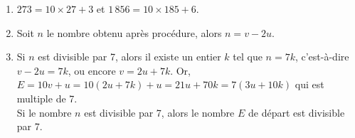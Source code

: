 \begin{enumerate}
         \begin{enumerate}
            \item {\blue $273 =10\times27+3$} et {\blue $1\,856 =10\times185+6$.}
            \item Soit $n$ le nombre obtenu après procédure, alors {\blue $n=v-2u$.}
            \item Si $n$ est divisible par 7, alors il existe un entier $k$ tel que $n=7k$, c'est-à-dire $v-2u =7k$, ou encore $v=2u+7k$. Or, $E =10v+u =10(2u+7k)+u =21u+70k =7(3u+10k)$ qui est multiple de 7. \\
               {\blue Si le nombre $n$ est divisible par 7, alors le nombre $E$ de départ est divisible par 7.}
      \end{enumerate}
   \end{enumerate}
